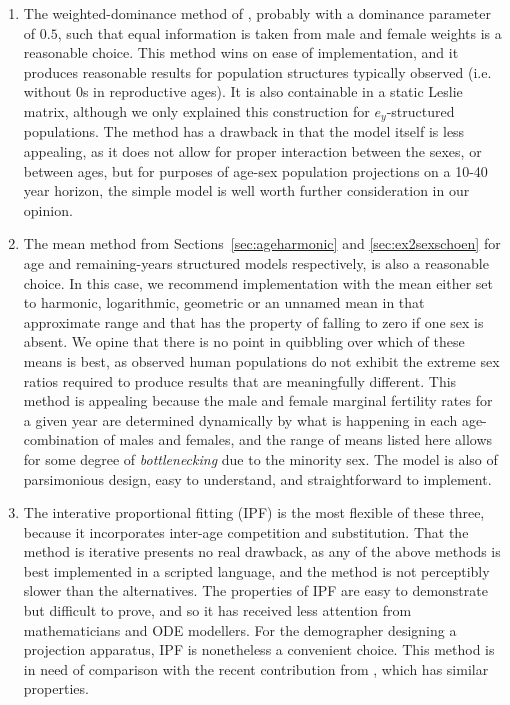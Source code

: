 \begin{enumerate}
\item The weighted-dominance method of \citet{goodman1967age}, probably with
a dominance parameter of $0.5$, such that equal information is taken from male and female
weights is a reasonable choice. This method wins on ease of implementation, and
it produces reasonable results for population structures typically observed (i.e. without 0s in
reproductive ages). It is also containable in a static Leslie matrix, although
we only explained this construction for $e_y$-structured populations. The
method has a drawback in that the model itself is less appealing, as it does 
not allow for proper interaction between the sexes, or between ages, but for
purposes of age-sex population projections on a 10-40 year horizon, the simple
model is well worth further consideration in our opinion.

\item The mean method from Sections~\ref{sec:ageharmonic} and
\ref{sec:ex2sexschoen} for age and remaining-years structured models
respectively, is also a reasonable choice. In this case, we recommend
implementation with the mean either set to harmonic, logarithmic, geometric or
an unnamed mean in that approximate range and that has the property of 
falling to zero if one sex is absent. We opine that there is no point in
quibbling over which of these means is best, as observed human populations do
not exhibit the extreme sex ratios required to produce results that are
meaningfully different. This method is appealing because the male and female
marginal fertility rates for a given year are determined dynamically by 
what is happening in each age-combination of males and females, and the range
of means listed here allows for some degree of \textit{bottlenecking} due to
the minority sex. The model is also of parsimonious design, easy to understand,
and straightforward to implement.

\item The interative proportional fitting (IPF) is the most flexible of
these three, because it incorporates inter-age competition and substitution. That the method is
iterative presents no real drawback, as any of the above methods is best 
implemented in a scripted language, and the method is
not perceptibly slower than the alternatives. The properties of IPF are easy to
demonstrate but difficult to prove, and so it has received less attention from
mathematicians and ODE modellers. For the demographer designing a projection
apparatus, IPF is nonetheless a convenient choice. This method is in need of
comparison with the recent contribution from \citet{choo2006estimating}, which
has similar properties.
\end{enumerate}

